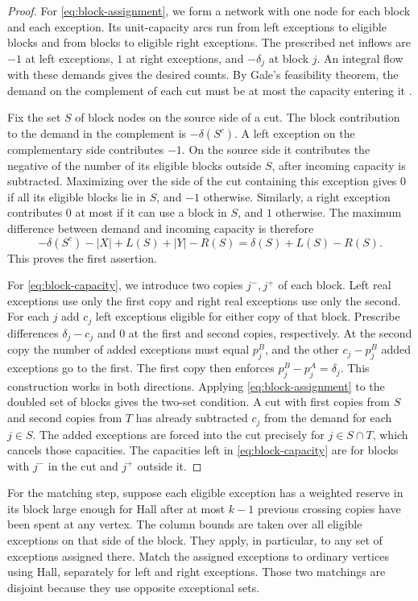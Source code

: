 \begin{proof}
For \eqref{eq:block-assignment}, we form a network with one node for each block and each exception. Its unit-capacity arcs run from left exceptions to eligible blocks and from blocks to eligible right exceptions. The prescribed net inflows are \(-1\) at left exceptions, \(1\) at right exceptions, and \(-\delta_j\) at block \(j\). An integral flow with these demands gives the desired counts. By Gale's feasibility theorem, the demand on the complement of each cut must be at most the capacity entering it \cite{Gale}.

Fix the set \(S\) of block nodes on the source side of a cut. The block contribution to the demand in the complement is \(-\delta(S^c)\). A left exception on the complementary side contributes \(-1\). On the source side it contributes the negative of the number of its eligible blocks outside \(S\), after incoming capacity is subtracted. Maximizing over the side of the cut containing this exception gives \(0\) if all its eligible blocks lie in \(S\), and \(-1\) otherwise. Similarly, a right exception contributes \(0\) at most if it can use a block in \(S\), and \(1\) otherwise. The maximum difference between demand and incoming capacity is therefore
\[
 -\delta(S^c)-|X|+L(S)+|Y|-R(S)
 =\delta(S)+L(S)-R(S).
\]
This proves the first assertion.

For \eqref{eq:block-capacity}, we introduce two copies \(j^-,j^+\) of each block. Left real exceptions use only the first copy and right real exceptions use only the second. For each \(j\) add \(c_j\) left exceptions eligible for either copy of that block. Prescribe differences \(\delta_j-c_j\) and \(0\) at the first and second copies, respectively. At the second copy the number of added exceptions must equal \(p^B_j\), and the other \(c_j-p^B_j\) added exceptions go to the first. The first copy then enforces \(p^B_j-p^A_j=\delta_j\). This construction works in both directions. Applying \eqref{eq:block-assignment} to the doubled set of blocks gives the two-set condition. A cut with first copies from \(S\) and second copies from \(T\) has already subtracted \(c_j\) from the demand for each \(j\in S\). The added exceptions are forced into the cut precisely for \(j\in S\cap T\), which cancels those capacities. The capacities left in \eqref{eq:block-capacity} are for blocks with \(j^-\) in the cut and \(j^+\) outside it.
\end{proof}

For the matching step, suppose each eligible exception has a weighted reserve in its block large enough for Hall after at most \(k-1\) previous crossing copies have been spent at any vertex. The column bounds are taken over all eligible exceptions on that side of the block. They apply, in particular, to any set of exceptions assigned there. Match the assigned exceptions to ordinary vertices using Hall, separately for left and right exceptions. Those two matchings are disjoint because they use opposite exceptional sets.

